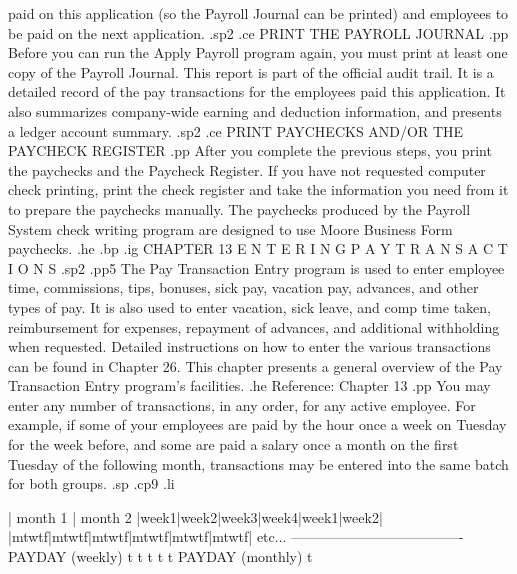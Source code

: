 paid on this application (so the Payroll Journal can be printed)
and employees to be paid on the next application.
.sp2
.ce
PRINT THE PAYROLL JOURNAL
.pp
Before you can run the Apply Payroll program again, you must print
at least one copy of the Payroll Journal.  This report is part of the
official audit trail. It is a detailed record of the pay transactions
for the employees paid this application. It also summarizes company-wide
earning and deduction information, and presents a ledger account
summary.
.sp2
.ce
PRINT PAYCHECKS AND/OR THE PAYCHECK REGISTER
.pp
After you complete the previous steps, you print the paychecks
and the Paycheck Register.  If you have not requested
computer check printing,
print the check register and take
the information you need from it to prepare the paychecks manually.
The paychecks produced by the Payroll System check
writing program are designed to use Moore Business Form paychecks.
.he
.bp
.ig
CHAPTER 13
E N T E R I N G    P A Y    T R A N S A C T I O N S
.sp2
.pp5
The Pay Transaction Entry program is used to enter employee time,
commissions, tips, bonuses, sick pay, vacation pay, advances, and
other types of pay.  It is also used to enter vacation, sick leave,
and comp time taken, reimbursement for expenses, repayment of advances,
and additional withholding when requested.  Detailed instructions on
how to enter the various transactions
can be found in Chapter 26.  This chapter presents a general
overview of the Pay Transaction Entry program's facilities.
.he Reference: Chapter 13
.pp
You may enter any number of transactions, in any order, for any active
employee.  For example, if some of your employees are paid by the
hour once a week on Tuesday for the week before,
and some are paid a salary once
a month on the first Tuesday of the following month, transactions
may be entered into the same batch for both groups.
.sp
.cp9
.li

		 |	month 1 	 |   month 2
		 |week1|week2|week3|week4|week1|week2|
		 |mtwtf|mtwtf|mtwtf|mtwtf|mtwtf|mtwtf| etc...
		 -------------------------------------
PAYDAY (weekly) 	 t     t     t	   t	 t
PAYDAY (monthly)			   t

